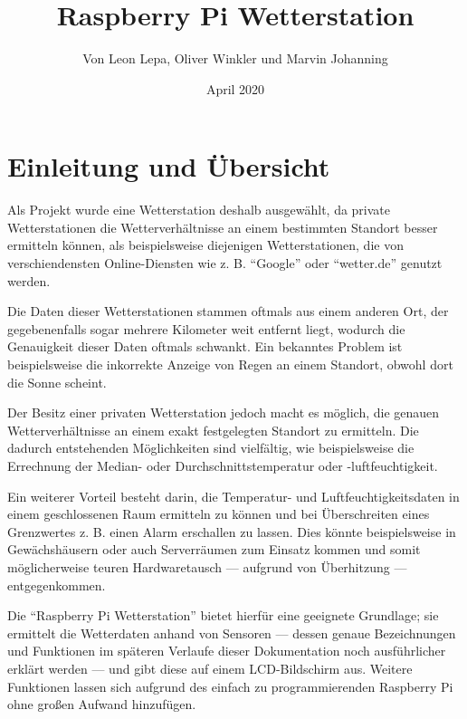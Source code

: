 \documentclass[a4paper,12pt]{article}
\begin{document}
\title{\textbf{Raspberry Pi Wetterstation}}
\author{Von Leon Lepa, Oliver Winkler und Marvin Johanning}
\date{April 2020}
\maketitle
{}
\pagebreak

\tableofcontents
\pagebreak

\setlength{\headheight}{15.2pt}
\pagestyle{fancy}
\renewcommand{\headrulewidth}{2pt}
\renewcommand{\footrulewidth}{2pt}

\section{Einleitung und Übersicht}
Als Projekt wurde eine Wetterstation deshalb ausgewählt, da private Wetterstationen die Wetterverhältnisse an einem bestimmten Standort besser ermitteln können, als beispielsweise diejenigen Wetterstationen, die von verschiendensten Online-Diensten wie z. B. "`Google"' oder "`wetter.de"' genutzt werden.

Die Daten dieser Wetterstationen stammen oftmals aus einem anderen Ort, der gegebenenfalls sogar mehrere Kilometer weit entfernt liegt, wodurch die Genauigkeit dieser Daten oftmals schwankt. Ein bekanntes Problem ist beispielsweise die inkorrekte Anzeige von Regen an einem Standort, obwohl dort die Sonne scheint.

Der Besitz einer privaten Wetterstation jedoch macht es möglich, die genauen Wetterverhältnisse an einem exakt festgelegten Standort zu ermitteln. Die dadurch entstehenden Möglichkeiten sind vielfältig, wie beispielsweise die Errechnung der Median- oder Durchschnittstemperatur oder -luftfeuchtigkeit.

Ein weiterer Vorteil besteht darin, die Temperatur- und Luftfeuchtigkeitsdaten in einem geschlossenen Raum ermitteln zu können und bei Überschreiten eines Grenzwertes z. B. einen Alarm erschallen zu lassen. Dies könnte beispielsweise in Gewächshäusern oder auch Serverräumen zum Einsatz kommen und somit möglicherweise teuren Hardwaretausch — aufgrund von Überhitzung — entgegenkommen.

Die "`Raspberry Pi Wetterstation"' bietet hierfür eine geeignete Grundlage; sie ermittelt die Wetterdaten anhand von Sensoren — dessen genaue Bezeichnungen und Funktionen im späteren Verlaufe dieser Dokumentation noch ausführlicher erklärt werden — und gibt diese auf einem LCD-Bildschirm aus. Weitere Funktionen lassen sich aufgrund des einfach zu programmierenden Raspberry Pi ohne großen Aufwand hinzufügen.
\end{document}

